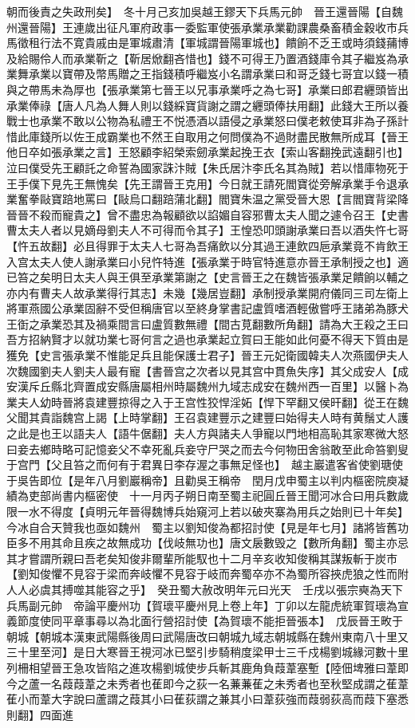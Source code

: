 朝而後責之失政刑矣】　冬十月己亥加吳越王鏐天下兵馬元帥　晉王還晉陽【自魏州還晉陽】王連歲出征凡軍府政事一委監軍使張承業承業勸課農桑畜積金穀收市兵馬徵租行法不寛貴戚由是軍城肅清【軍城謂晉陽軍城也】饋餉不乏王或時須錢蒱博及給賜伶人而承業靳之【靳居焮翻吝惜也】錢不可得王乃置酒錢庫令其子繼岌為承業舞承業以寶帶及幣馬贈之王指錢積呼繼岌小名謂承業曰和哥乏錢七哥宜以錢一積與之帶馬未為厚也【張承業第七晉王以兄事承業呼之為七哥】承業曰郎君纒頭皆出承業俸祿【唐人凡為人舞人則以錢綵寶貨謝之謂之纒頭俸扶用翻】此錢大王所以養戰士也承業不敢以公物為私禮王不悦憑酒以語侵之承業怒曰僕老敕使耳非為子孫計惜此庫錢所以佐王成霸業也不然王自取用之何問僕為不過財盡民散無所成耳【晉王他日卒如張承業之言】王怒顧李紹榮索劒承業起挽王衣【索山客翻挽武遠翻引也】泣曰僕受先王顧託之命誓為國家誅汴賊【朱氏居汴李氏名其為賊】若以惜庫物死于王手僕下見先王無愧矣【先王謂晉王克用】今日就王請死閻寶從旁解承業手令退承業奮拳敺寶踣地罵曰【敺烏口翻踣蒲北翻】閻寶朱温之黨受晉大恩【言閻寶背梁降晉晉不殺而寵貴之】曾不盡忠為報顧欲以諂媚自容邪曹太夫人聞之遽令召王【史書曹太夫人者以見嫡母劉夫人不可得而令其子】王惶恐叩頭謝承業曰吾以酒失忤七哥【忤五故翻】必且得罪于太夫人七哥為吾痛飲以分其過王連飲四巵承業竟不肯飲王入宫太夫人使人謝承業曰小兒忤特進【張承業于時官特進意亦晉王承制授之也】適已笞之矣明日太夫人與王俱至承業第謝之【史言晉王之在魏皆張承業足饋餉以輔之亦内有曹夫人故承業得行其志】未幾【幾居豈翻】承制授承業開府儀同三司左衛上將軍燕國公承業固辭不受但稱唐官以至終身掌書記盧質嗜酒輕傲嘗呼王諸弟為豚犬王衘之承業恐其及禍乘間言曰盧質數無禮【間古莧翻數所角翻】請為大王殺之王曰吾方招納賢才以就功業七哥何言之過也承業起立賀曰王能如此何憂不得天下質由是獲免【史言張承業不惟能足兵且能保護士君子】晉王元妃衛國韓夫人次燕國伊夫人次魏國劉夫人劉夫人最有寵【書晉宫之次者以見其宫中貫魚失序】其父成安人【成安漢斥丘縣北齊置成安縣唐屬相州時屬魏州九域志成安在魏州西一百里】以醫卜為業夫人幼時晉將袁建豐掠得之入于王宫性狡悍淫妬【悍下罕翻又侯旰翻】從王在魏父聞其貴詣魏宫上謁【上時掌翻】王召袁建豐示之建豐曰始得夫人時有黄鬚丈人護之此是也王以語夫人【語牛倨翻】夫人方與諸夫人爭寵以門地相高恥其家寒微大怒曰妾去鄉時略可記憶妾父不幸死亂兵妾守尸哭之而去今何物田舍翁敢至此命笞劉叟于宫門【父且笞之而何有于君異日李存渥之事無足怪也】　越主巖遣客省使劉瑭使于吳告即位【是年八月劉巖稱帝】且勸吳王稱帝　閏月戊申蜀主以判内樞密院庾凝績為吏部尚書内樞密使　十一月丙子朔日南至蜀主祀圓丘晉王聞河冰合曰用兵數歲限一水不得度【貞明元年晉得魏博兵始窺河上若以破夾寨為用兵之始則已十年矣】今冰自合天贊我也亟如魏州　蜀主以劉知俊為都招討使【見是年七月】諸將皆舊功臣多不用其命且疾之故無成功【伐岐無功也】唐文扆數毁之【數所角翻】蜀主亦忌其才嘗謂所親曰吾老矣知俊非爾輩所能馭也十二月辛亥收知俊稱其謀叛斬于炭市【劉知俊懼不見容于梁而奔岐懼不見容于岐而奔蜀卒亦不為蜀所容挾虎狼之性而附人人必虞其搏噬其能容之乎】　癸丑蜀大赦改明年元曰光天　壬戌以張宗奭為天下兵馬副元帥　帝論平慶州功【賀瓌平慶州見上卷上年】丁卯以左龍虎統軍賀瓌為宣義節度使同平章事尋以為北面行營招討使【為賀瓌不能拒晉張本】　戊辰晉王畋于朝城【朝城本漢東武陽縣後周曰武陽唐改曰朝城九域志朝城縣在魏州東南八十里又三十里至河】是日大寒晉王視河冰已堅引步騎稍度梁甲士三千戍楊劉城緣河數十里列柵相望晉王急攻皆陷之進攻楊劉城使步兵斬其鹿角負葭葦塞塹【陸佃埤雅曰葦即今之蘆一名葭葭葦之未秀者也萑即今之荻一名蒹蒹萑之未秀者也至秋堅成謂之萑葦萑小而葦大字說曰蘆謂之葭其小曰萑荻謂之兼其小曰葦荻強而葭弱荻高而葭下塞悉則翻】四面進